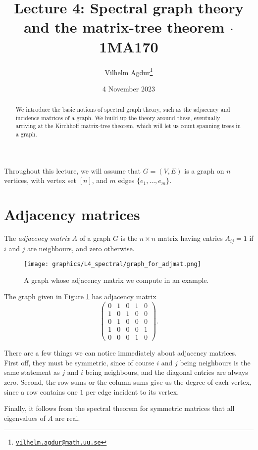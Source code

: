 \documentclass[nobib]{tufte-handout}
\title{Lecture 4: Spectral graph theory and the matrix-tree theorem $\cdot$ 1MA170}
\author[Vilhelm Agdur]{Vilhelm Agdur\thanks{\href{mailto:vilhelm.agdur@math.uu.se}{\nolinkurl{vilhelm.agdur@math.uu.se}}}}
\date{4 November 2023}
\begin{document}
\maketitle%

\begin{abstract}
\noindent
We introduce the basic notions of spectral graph theory, such as the adjacency and incidence matrices of a graph. We build up the theory around these, eventually arriving at the Kirchhoff matrix-tree theorem, which will let us count spanning trees in a graph.
\end{abstract}

Throughout this lecture, we will assume that $G = (V, E)$ is a graph on $n$ vertices, with vertex set $[n]$, and $m$ edges $\{e_1, \ldots, e_m\}$.

\section{Adjacency matrices}

\begin{definition}
    The \emph{adjacency matrix} $A$ of a graph $G$ is the $n\times n$ matrix having entries $A_{ij} = 1$ if $i$ and $j$ are neighbours, and zero otherwise.
\end{definition}

\begin{figure}
    \centering
    \texttt{[image: graphics/L4\_spectral/graph\_for\_adjmat.png]}
    \caption{A graph whose adjacency matrix we compute in an example.}
    \label{fig:graph_for_adjmat}
\end{figure}

\begin{example}
    The graph given in Figure \ref{fig:graph_for_adjmat} has adjacency matrix
    $$\begin{pmatrix}
        0 & 1 & 0 & 1 & 0 \\
        1 & 0 & 1 & 0 & 0 \\
        0 & 1 & 0 & 0 & 0 \\
        1 & 0 & 0 & 0 & 1 \\
        0 & 0 & 0 & 1 & 0 
        \end{pmatrix}.$$
\end{example}

\begin{remark}
    There are a few things we can notice immediately about adjacency matrices. First off, they must be symmetric, since of course $i$ and $j$ being neighbours is the same statement as $j$ and $i$ being neighbours, and the diagonal entries are always zero. Second, the row sums or the column sums give us the degree of each vertex, since a row contains one $1$ per edge incident to its vertex.

    Finally, it follows from the spectral theorem for symmetric matrices that all eigenvalues of $A$ are real.
\end{remark}
\end{document}

